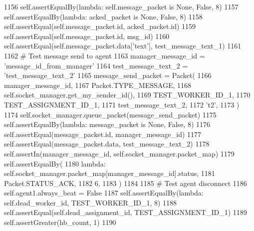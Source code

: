 \begin{DoxyCode}
1156         self.assertEqualBy(\textcolor{keyword}{lambda}: self.message\_packet \textcolor{keywordflow}{is} \textcolor{keywordtype}{None}, \textcolor{keyword}{False}, 8)
1157         self.assertEqualBy(\textcolor{keyword}{lambda}: acked\_packet \textcolor{keywordflow}{is} \textcolor{keywordtype}{None}, \textcolor{keyword}{False}, 8)
1158         self.assertEqual(self.message\_packet.id, acked\_packet.id)
1159         self.assertEqual(self.message\_packet.id, msg\_id)
1160         self.assertEqual(self.message\_packet.data[\textcolor{stringliteral}{'text'}], test\_message\_text\_1)
1161 
1162         \textcolor{comment}{# Test message send to agent}
1163         manager\_message\_id = \textcolor{stringliteral}{'message\_id\_from\_manager'}
1164         test\_message\_text\_2 = \textcolor{stringliteral}{'test\_message\_text\_2'}
1165         message\_send\_packet = Packet(
1166             manager\_message\_id,
1167             Packet.TYPE\_MESSAGE,
1168             self.socket\_manager.get\_my\_sender\_id(),
1169             TEST\_WORKER\_ID\_1,
1170             TEST\_ASSIGNMENT\_ID\_1,
1171             test\_message\_text\_2,
1172             \textcolor{stringliteral}{'t2'},
1173         )
1174         self.socket\_manager.queue\_packet(message\_send\_packet)
1175         self.assertEqualBy(\textcolor{keyword}{lambda}: message\_packet \textcolor{keywordflow}{is} \textcolor{keywordtype}{None}, \textcolor{keyword}{False}, 8)
1176         self.assertEqual(message\_packet.id, manager\_message\_id)
1177         self.assertEqual(message\_packet.data, test\_message\_text\_2)
1178         self.assertIn(manager\_message\_id, self.socket\_manager.packet\_map)
1179         self.assertEqualBy(
1180             \textcolor{keyword}{lambda}: self.socket\_manager.packet\_map[manager\_message\_id].status,
1181             Packet.STATUS\_ACK,
1182             6,
1183         )
1184 
1185         \textcolor{comment}{# Test agent disconnect}
1186         self.agent1.always\_beat = \textcolor{keyword}{False}
1187         self.assertEqualBy(\textcolor{keyword}{lambda}: self.dead\_worker\_id, TEST\_WORKER\_ID\_1, 8)
1188         self.assertEqual(self.dead\_assignment\_id, TEST\_ASSIGNMENT\_ID\_1)
1189         self.assertGreater(hb\_count, 1)
1190 
\end{DoxyCode}
\mbox{\label{classparlai_1_1mturk_1_1core_1_1legacy__2018_1_1test_1_1test__socket__manager_1_1TestSocketManagerMessageHandling_a601d1c2132f2ea5b1d63235764751147}} 
